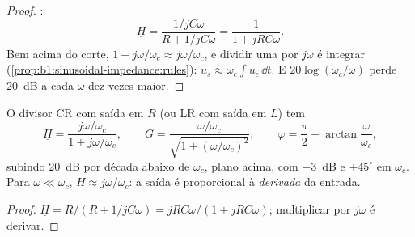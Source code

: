 \begin{proof}
:
\[
\underline H = \frac{1/jC\omega}{R + 1/jC\omega} = \frac{1}{1 + jRC\omega} .
\]
Bem acima do corte, $1 + j\omega/\omega_c \approx j\omega/\omega_c$, e
dividir uma  por $j\omega$ é integrar
(\cref{prop:b1:sinusoidal-impedance:rules}): $u_s \approx \omega_c\int u_e\,\dd t$.
E $20\log(\omega_c/\omega)$ perde \qty{20}{dB} a cada $\omega$ dez vezes maior.
\end{proof}

\begin{proposition}\label{prop:b1:filters-transfer-functions:highpass1}
O divisor CR com saída em $R$ (ou LR com saída em $L$)
tem
\[
\underline H = \frac{j\omega/\omega_c}{1 + j\omega/\omega_c},
\qquad G = \frac{\omega/\omega_c}{\sqrt{1 + (\omega/\omega_c)^2}},
\qquad \varphi = \frac{\pi}{2} - \arctan\frac{\omega}{\omega_c},
\]
subindo \qty{20}{dB} por década abaixo de $\omega_c$, plano acima, com \qty{-3}{dB}
e $+45^\circ$ em $\omega_c$. Para $\omega \ll \omega_c$, $\underline H
\approx j\omega/\omega_c$: a saída é proporcional à
\emph{derivada} da entrada.
\end{proposition}

\begin{proof}
$\underline H = R/(R + 1/jC\omega) = jRC\omega/(1 + jRC\omega)$;
multiplicar por $j\omega$ é derivar.
\end{proof}

